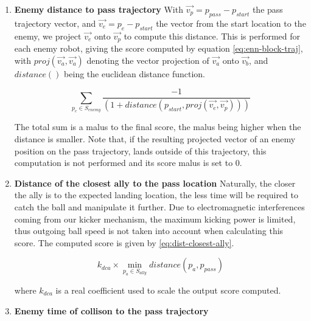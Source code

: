 \begin{enumerate}
    \item \textbf{Enemy distance to pass trajectory}
    With $\overrightarrow{v_p} = p_{pass} - p_{start}$ the pass trajectory vector,
    and $\overrightarrow{v_e} = p_e - p_{start}$ the vector from the start location to the enemy,
    we project $\overrightarrow{v_e}$ onto $\overrightarrow{v_p}$ to compute this distance.
    This is performed for each enemy robot, giving the score computed by equation \ref{eq:enn-block-traj},
    with $proj(\overrightarrow{v_a}, \overrightarrow{v_a})$ denoting the vector projection of $\overrightarrow{v_a}$ onto $\overrightarrow{v_b}$, and $distance()$ being the euclidean distance function.
    
    \begin{equation}
        \label{eq:enn-block-traj}
        \sum_{p_{e} \in S_{enemy}}{\frac{-1}{(1 + distance(p_{start}, proj(\overrightarrow{v_e}, \overrightarrow{v_p})))}}
    \end{equation}

    The total sum is a malus to the final score, the malus being higher when the distance is smaller.
    Note that, if the resulting projected vector of an enemy position on the pass trajectory,
    lands outside of this trajectory, this computation is not performed and its score malus is set to 0.

    \item \textbf{Distance of the closest ally to the pass location}
    Naturally, the closer the ally is to the expected landing location, the less time will be required
    to catch the ball and manipulate it further. Due to electromagnetic interferences coming
    from our kicker mechanism, the maximum kicking power is limited, thus outgoing ball speed
    is not taken into account when calculating this score.
    The computed score is given by \ref{eq:dist-closest-ally}.
    
    \begin{equation}
        \label{eq:dist-closest-ally}
        k_{dca} \times \min_{p_a \in S_{ally}}{distance(p_a, p_{pass})}
    \end{equation}
    
    where $k_{dca}$ is a real coefficient used to scale the output score computed.

    \item \textbf{Enemy time of collison to the pass trajectory}

\end{enumerate}

